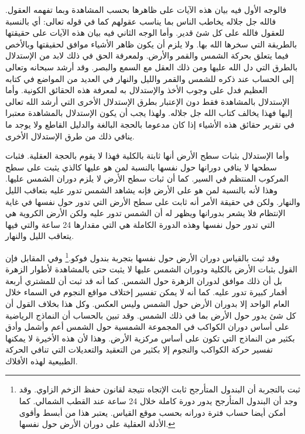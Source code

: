فالوجه الأول فيه بيان هذه الآيات على ظاهرها بحسب المشاهدة وبما تفهمه العقول.
فالله جل جلاله يخاطب الناس بما يناسب عقولهم كما في قوله تعالى: \quranayah*[30][27][7-9] {\footnotesize (\surahname*[30])} أي بالنسبة للعقول فالله على كل شئ قدير. وأما الوجه الثاني فيه بيان هذه الآيات على حقيقتها بالطريقة التي سخرها الله بها. ولا يلزم أن يكون ظاهر الأشياء موافق لحقيقتها وبالأخص فيما يتعلق بحركة الشمس والقمر والأرض. ولمعرفة الحق في ذلك لابد من الإستدلال بالطرق التي دل الله عليها ومن ذلك العقل مع السمع والبصر. وقد أرشد سبحانه وتعالى إلى الحساب عند ذكره للشمس والقمر والليل والنهار في العديد من المواضع في كتابه العظيم فدل على وجوب الأخذ والإستدلال به لمعرفة هذه الحقائق الكونية. وأما الإستدلال بالمشاهدة فقط دون الإعتبار بطرق الإستدلال الأخرى التي أرشد الله تعالى إليها فهذا يخالف كتاب الله جل جلاله. ولهذا يجب أن يكون الإستدلال بالمشاهدة معتبرا في تقرير حقائق هذه الأشياء إذا كان مدعوما بالحجة البالغة والدليل القاطع ولا يوجد ما ينافي ذلك من طرق الإستدلال الأخرى.

وأما الإستدلال بثبات سطح الأرض أنها ثابتة بالكلية فهذا لا يقوم بالحجة العقلية. فثبات سطحها لا ينافي دورانها حول نفسها بالنسبة لمن هو عليها كالذي يثبت على سطح المركوب المنتظم في السير. كما أن ثبات سطح الأرض لا يلزم دوران الشمس عليها. وهذا لأنه بالنسبة لمن هو على الأرض فإنه يشاهد الشمس تدور عليه بتعاقب الليل والنهار. ولكن في حقيقة الأمر أنه ثابت على سطح الأرض التي تدور حول نفسها في غاية الإنتظام فلا يشعر بدورانها ويظهر له أن الشمس تدور عليه ولكن الأرض الكروية هي التي تدور حول نفسها وهذه الدورة الكاملة هي التي مقدارها 24 ساعة والتي فيها يتعاقب الليل والنهار. 

وقد ثبت بالقياس دوران الأرض حول نفسها بتجربة بندول فوكو.\footnote{ثبت بالتجربة أن البندول المتأرجح ثابت الإتجاه نتيجة لقانون حفظ الزخم الزاوي. وقد وجد أن البندول المتأرجح يدور دورة كاملة خلال 24 ساعة عند القطب الشمالي. كما أمكن أيضا حساب فترة دورانه بحسب موقع القياس. يعتبر هذا من أبسط وأقوى الأدلة العقلية على دوران الأرض حول نفسها.} وفي المقابل فإن القول بثبات الأرض بالكلية ودوران الشمس عليها لا يثبت حتى بالمشاهدة لأطوار الزهرة بل أن ذلك موافق لدوران الزهرة حول الشمس. كما أنه قد ثبت أن للمشتري أربعة أقمار كبيرة تدور عليه. كما أنه لا يمكن تفسير إختلاف مواقع النجوم في السماء خلال العام الواحد إلا بدوران الأرض حول الشمس وليس العكس. وكل هذا بخلاف القول أن كل شئ يدور حول الأرض بما في ذلك الشمس. وقد تبين بالحساب أن النماذج الرياضية على أساس دوران الكواكب في المجموعة الشمسية حول الشمس أعم وأشمل وأدق بكثير من النماذج التي تكون على أساس مركزية الأرض. وهذا لأن هذه الأخيرة لا يمكنها تفسير حركة الكواكب والنجوم إلا بكثير من التعقيد والتعديلات التي تنافي الحركة الطبيعية لهذه الأفلاك.

